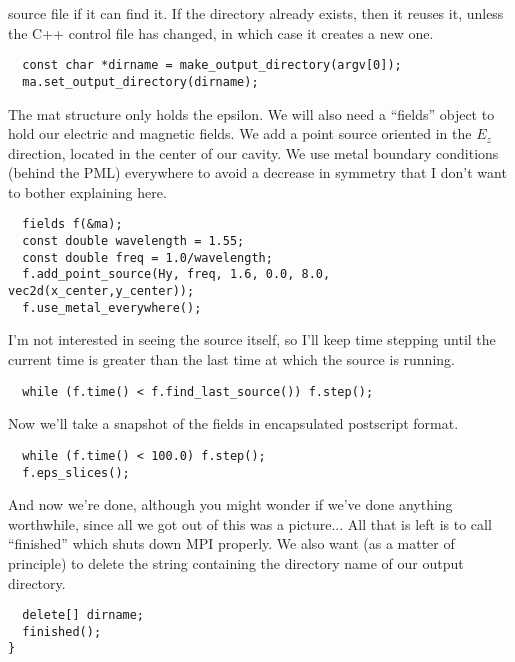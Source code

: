 source file if it can find it.  If the directory already exists, then it
reuses it, unless the C++ control file has changed, in which case it
creates a new one.
\begin{verbatim}
  const char *dirname = make_output_directory(argv[0]);
  ma.set_output_directory(dirname);
\end{verbatim}
The mat structure only holds the epsilon.  We will also need a ``fields''
object to hold our electric and magnetic fields.  We add a point source
oriented in the $E_z$ direction, located in the center of our cavity.  We
use metal boundary conditions (behind the PML) everywhere to avoid a
decrease in symmetry that I don't want to bother explaining here.
\begin{verbatim}
  fields f(&ma);
  const double wavelength = 1.55;
  const double freq = 1.0/wavelength;
  f.add_point_source(Hy, freq, 1.6, 0.0, 8.0, vec2d(x_center,y_center));
  f.use_metal_everywhere();
\end{verbatim}
I'm not interested in seeing the source itself, so I'll keep time stepping
until the current time is greater than the last time at which the source is
running.
\begin{verbatim}
  while (f.time() < f.find_last_source()) f.step();
\end{verbatim}
Now we'll take a snapshot of the fields in encapsulated postscript format.
\begin{verbatim}
  while (f.time() < 100.0) f.step();
  f.eps_slices();
\end{verbatim}
And now we're done, although you might wonder if we've done anything
worthwhile, since all we got out of this was a picture... All that is left
is to call ``finished'' which shuts down MPI properly.  We also want (as a
matter of principle) to delete the string containing the directory name of
our output directory.
\begin{verbatim}
  delete[] dirname;
  finished();
}
\end{verbatim}
